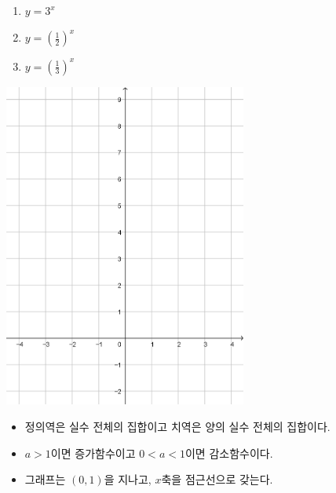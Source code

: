 \documentclass{oblivoir}
\begin{document}
\newpage
%
\begin{enumerate}\label{exp2}
\item
\(y=3^x\)
\item
\(y=(\frac12)^x\)
\item
\(y=(\frac13)^x\)
\end{enumerate}
\begin{center}
\includegraphics[width=0.6\textwidth]{49grid}
\end{center}

\begin{mdframed}
%
\begin{itemize}\label{exp3}
\item
정의역은 실수 전체의 집합이고 치역은 양의 실수 전체의 집합이다.
\item
\(a>1\)이면 증가함수이고 \(0<a<1\)이면 감소함수이다.
\item
그래프는 \((0,1)\)을 지나고, \(x\)축을 점근선으로 갖는다.
\end{itemize}
\end{mdframed}
\end{document}
